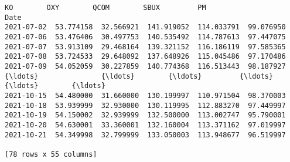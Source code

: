 \documentclass[11pt]{article}
\begin{document}
\begin{tcolorbox}[breakable, size=fbox, boxrule=.5pt, pad at break*=1mm, opacityfill=0]
\begin{Verbatim}[commandchars=\\\{\}]
                   KO        OXY        QCOM        SBUX         PM
Date
2021-07-02  53.774158  32.566921  141.919052  114.033791  99.076950
2021-07-06  53.476406  30.497753  140.535492  114.787613  97.447075
2021-07-07  53.913109  29.468164  139.321152  116.186119  97.585365
2021-07-08  53.724533  29.648092  137.648926  115.045486  97.170486
2021-07-09  54.052059  30.227859  140.774368  116.513443  98.187927
{\ldots}               {\ldots}        {\ldots}         {\ldots}         {\ldots}        {\ldots}
2021-10-15  54.480000  31.660000  130.199997  110.971504  98.370003
2021-10-18  53.939999  32.930000  130.119995  112.883270  97.449997
2021-10-19  54.150002  32.939999  132.500000  113.002747  95.790001
2021-10-20  54.630001  33.360001  132.160004  113.371162  97.019997
2021-10-21  54.349998  32.799999  133.050003  113.948677  96.519997

[78 rows x 55 columns]
\end{Verbatim}
\end{tcolorbox}
        
\end{document}
